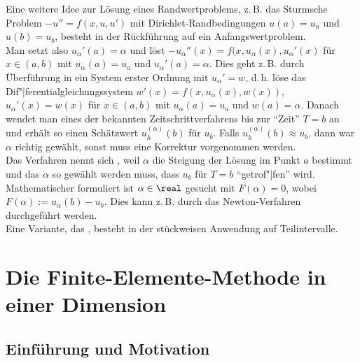 \begin{Bem}
    Eine weitere Idee zur Lösung eines Randwertproblems, z.\,B.
    das Sturmsche Problem $-u'' = f(x, u, u')$ mit Dirichlet-Randbedingungen
    $u(a) = u_a$ und $u(b) = u_b$, besteht in der Rückführung auf ein
    Anfangswertproblem.\\
    Man setzt also $u_\alpha'(a) = \alpha$ und löst
    $-u_\alpha''(x) = f(x, u_\alpha(x), u_\alpha'(x)$ für $x \in (a, b)$
    mit $u_\alpha(a) = u_a$ und $u_\alpha'(a) = \alpha$.
    Dies geht z.\,B. durch Überführung in ein System erster Ordnung mit
    $u_\alpha' = w$, d.\,h. löse das Dif"|ferentialgleichungssystem
    $w'(x) = f(x, u_\alpha(x), w(x))$, $u_\alpha'(x) = w(x)$ für $x \in (a, b)$
    mit $u_\alpha(a) = u_a$ und $w(a) = \alpha$.
    Danach wendet man eines der bekannten Zeitschrittverfahrens bis zur
    "`Zeit"' $T = b$ an und erhält so einen Schätzwert
    $u_h^{(\alpha)}(b)$ für $u_b$.
    Falls $u_h^{(\alpha)}(b) \approx u_b$, dann war $\alpha$ richtig gewählt,
    sonst muss eine Korrektur vorgenommen werden.\\
    Das Verfahren nennt sich , weil $\alpha$ die
    Steigung der Lösung im Punkt $a$ bestimmt und das $\alpha$ so gewählt
    werden muss, dass $u_b$ für $T = b$ "`getrof"|fen"' wird.\\
    Mathematischer formuliert ist $\alpha \in \real$ gesucht mit
    $F(\alpha) = 0$, wobei $F(\alpha) := u_{\alpha}(b) - u_b$.
    Dies kann z.\,B. durch das Newton-Verfahren durchgeführt werden.\\
    Eine Variante, das , besteht in der
    stückweisen Anwendung auf Teilintervalle.
\end{Bem}

\pagebreak

\section{%
    Die Finite-Elemente-Methode in einer Dimension%
}

\subsection{%
    Einführung und Motivation%
}

